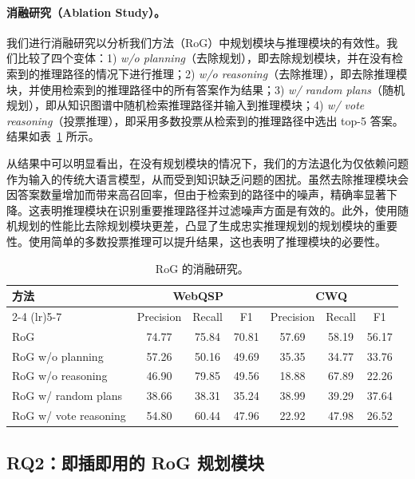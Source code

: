 \documentclass[11pt,UTF8,fontset=fandol]{ctexart}
\begin{document}
\paragraph{消融研究（Ablation Study）。}
我们进行消融研究以分析我们方法（RoG）中规划模块与推理模块的有效性。我们比较了四个变体：1) \emph{w/o planning}（去除规划），即去除规划模块，并在没有检索到的推理路径的情况下进行推理；2) \emph{w/o reasoning}（去除推理），即去除推理模块，并使用检索到的推理路径中的所有答案作为结果；3) \emph{w/ random plans}（随机规划），即从知识图谱中随机检索推理路径并输入到推理模块；4) \emph{w/ vote reasoning}（投票推理），即采用多数投票从检索到的推理路径中选出 top-5 答案。结果如表~\ref{tab:2} 所示。

从结果中可以明显看出，在没有规划模块的情况下，我们的方法退化为仅依赖问题作为输入的传统大语言模型，从而受到知识缺乏问题的困扰。虽然去除推理模块会因答案数量增加而带来高召回率，但由于检索到的路径中的噪声，精确率显著下降。这表明推理模块在识别重要推理路径并过滤噪声方面是有效的。此外，使用随机规划的性能比去除规划模块更差，凸显了生成忠实推理规划的规划模块的重要性。使用简单的多数投票推理可以提升结果，这也表明了推理模块的必要性。

\begin{table}[H]
\centering
\caption{RoG 的消融研究。}
\label{tab:2}
\begin{tabular}{lcccccc}
\toprule
\multirow{2}{*}{方法} & \multicolumn{3}{c}{WebQSP} & \multicolumn{3}{c}{CWQ} \\
\cmidrule(lr){2-4} \cmidrule(lr){5-7}
 & Precision & Recall & F1 & Precision & Recall & F1 \\
\midrule
RoG                   & 74.77 & 75.84 & 70.81 & 57.69 & 58.19 & 56.17 \\
RoG w/o planning      & 57.26 & 50.16 & 49.69 & 35.35 & 34.77 & 33.76 \\
RoG w/o reasoning     & 46.90 & 79.85 & 49.56 & 18.88 & 67.89 & 22.26 \\
RoG w/ random plans   & 38.66 & 38.31 & 35.24 & 38.99 & 39.29 & 37.64 \\
RoG w/ vote reasoning & 54.80 & 60.44 & 47.96 & 22.92 & 47.98 & 26.52 \\
\bottomrule
\end{tabular}
\end{table}

\subsection{RQ2：即插即用的 RoG 规划模块}
\end{document}
